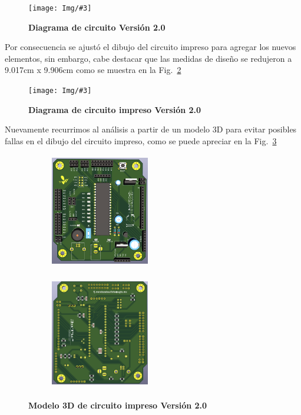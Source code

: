 \documentclass[times, 10pt,twocolumn]{article}
\newcommand{\Img}[5]{
   \begin{figure}[H]
   	   \centering
       \texttt{[image: Img/\#3]}
       \caption{ \centering \textbf{\small #4}}
       \label{#5}
   
       \end{figure}
   }
\begin{document}
\Img{8.5cm}{7.0cm}{Segunda_Version}{Diagrama de circuito Versión 2.0}{fig:5}
Por consecuencia se ajustó el dibujo del circuito impreso para agregar los nuevos elementos, sin embargo, cabe destacar que las medidas de diseño se redujeron a 9.017cm x 9.906cm como se muestra en la Fig.~\ref{fig:6}

\Img{8.5cm}{8.5cm}{segunda_version_pcb}{Diagrama de circuito impreso Versión 2.0}{fig:6}


Nuevamente recurrimos al análisis a partir de un modelo 3D para evitar posibles fallas en el dibujo del circuito impreso, como se puede apreciar en la Fig.~\ref{fig:7}

\begin{figure}[H]
  \begin{subfigure}[b]{0.4\columnwidth}
    \includegraphics[width=4.3cm, height=5.0cm]{Img/segunda_version_3d.png}
  \end{subfigure}
  \hspace{0.7cm}
  \begin{subfigure}[b]{0.4\columnwidth}
    \includegraphics[width=4.3cm, height=5.0cm]{Img/segunda_version_pcb_b.png}
  \end{subfigure}
   \caption{\centering \textbf{Modelo 3D de circuito impreso Versión 2.0}} 
   \label{fig:7}
 \end{figure}
\end{document}
